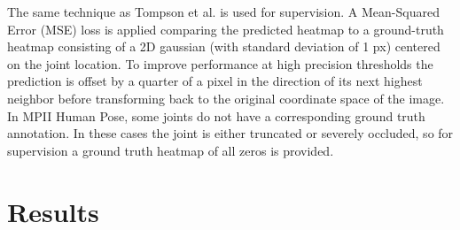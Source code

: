 \documentclass[runningheads]{llncs}
\begin{document}
The same technique as Tompson et al. \cite{tompson2014joint} is used
for supervision. A Mean-Squared Error (MSE) loss is applied comparing
the predicted heatmap to a ground-truth heatmap consisting of a 2D
gaussian (with standard deviation of 1 px) centered on the joint
location. To improve performance at high precision thresholds the
prediction is offset by a quarter of a pixel in the direction of its
next highest neighbor before transforming back to the original
coordinate space of the image. In MPII Human Pose, some joints do not
have a corresponding ground truth annotation. In these cases the joint
is either truncated or severely occluded, so for supervision a ground
truth heatmap of all zeros is provided.



\section{Results}
\end{document}
